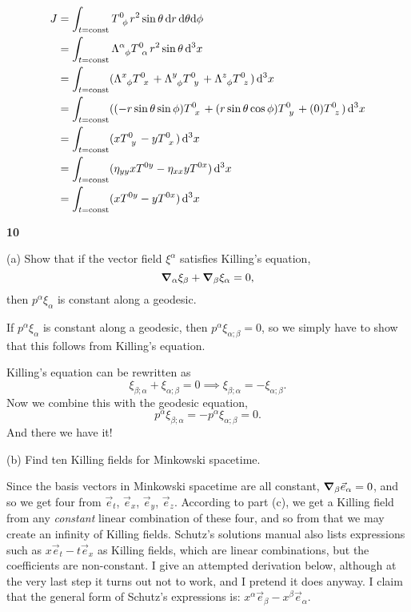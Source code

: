 \documentclass[gr-notes.tex]{subfiles}
\begin{document}
\begin{align*}
  J &=
  \int_{t = \mathrm{const}} {
    \tensor{T}{^0_\phi} r^2 \sin\theta
  } \dd{r} \dd\theta \dd\phi
  \\ &=
  \int_{t = \mathrm{const}} {
    \tensor{\Lambda}{^\alpha_\phi} \tensor{T}{^0_\alpha} r^2 \sin\theta
  } \dd[3]{x}
  \\ &=
  \int_{t = \mathrm{const}} (
    \tensor{\Lambda}{^x_\phi} \tensor{T}{^0_x} +
    \tensor{\Lambda}{^y_\phi} \tensor{T}{^0_y} +
    \tensor{\Lambda}{^z_\phi} \tensor{T}{^0_z}
  ) \dd[3]{x}
  \\ &=
  \int_{t = \mathrm{const}} (
    (-r \sin\theta \sin\phi) \tensor{T}{^0_x} +
    ( r \sin\theta \cos\phi) \tensor{T}{^0_y} +
    (0) \tensor{T}{^0_z}
  ) \dd[3]{x}
  \\ &=
  \int_{t = \mathrm{const}} (
    x \tensor{T}{^0_y} -
    y \tensor{T}{^0_x}
  ) \dd[3]{x}
  \\ &=
  \int_{t = \mathrm{const}} (
    \eta_{yy} x \tensor{T}{^{0y}} -
    \eta_{xx} y \tensor{T}{^{0x}}
  ) \dd[3]{x}
  \\ &=
  \int_{t = \mathrm{const}} (
    x \tensor{T}{^{0y}} -
    y \tensor{T}{^{0x}}
  ) \dd[3]{x}
\end{align*}


\textbf{10}

(a) Show that if the vector field $\xi^\alpha$ satisfies Killing's equation,
%
\begin{displaymath}
  \grad_\alpha \xi_\beta + \grad_\beta \xi_\alpha = 0,
\end{displaymath}
%
then $p^\alpha \xi_\alpha$ is constant along a geodesic.

If $p^\alpha \xi_\alpha$ is constant along a geodesic, then $p^\alpha \xi_{\alpha;\beta} = 0$, so we simply have to show that this follows from Killing's equation.

Killing's equation can be rewritten as
%
\begin{displaymath}
  \xi_{\beta;\alpha} + \xi_{\alpha;\beta} = 0 \implies
  \xi_{\beta;\alpha} = -\xi_{\alpha;\beta}.
\end{displaymath}
%
Now we combine this with the geodesic equation,
%
\begin{displaymath}
  p^\alpha \xi_{\beta;\alpha} = -p^\alpha \xi_{\alpha;\beta} = 0.
\end{displaymath}
%
And there we have it!

(b) Find ten Killing fields for Minkowski spacetime.

Since the basis vectors in Minkowski spacetime are all constant, $\grad_\beta \vec{e}_\alpha = 0$, and so we get four from $\vec{e}_t$, $\vec{e}_x$, $\vec{e}_y$, $\vec{e}_z$. According to part (c), we get a Killing field from any \emph{constant} linear combination of these four, and so from that we may create an infinity of Killing fields. Schutz's solutions manual also lists expressions such as $x \vec{e}_t - t \vec{e}_x$ as Killing fields, which are linear combinations, but the coefficients are non-constant. I give an attempted derivation below, although at the very last step it turns out not to work, and I pretend it does anyway. I claim that the general form of Schutz's expressions is: $x^\alpha \vec{e}_\beta - x^\beta \vec{e}_\alpha$.
\end{document}
